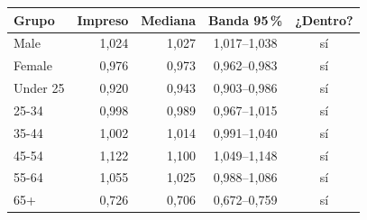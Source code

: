 \begin{tabular}{lrrcc}\toprule
Grupo & Impreso & Mediana & Banda 95\,\% & ¿Dentro? \\\midrule
Male & 1,024 & 1,027 & 1,017--1,038 & sí \\
Female & 0,976 & 0,973 & 0,962--0,983 & sí \\
Under 25 & 0,920 & 0,943 & 0,903--0,986 & sí \\
25-34 & 0,998 & 0,989 & 0,967--1,015 & sí \\
35-44 & 1,002 & 1,014 & 0,991--1,040 & sí \\
45-54 & 1,122 & 1,100 & 1,049--1,148 & sí \\
55-64 & 1,055 & 1,025 & 0,988--1,086 & sí \\
65+ & 0,726 & 0,706 & 0,672--0,759 & sí \\
\bottomrule\end{tabular}
